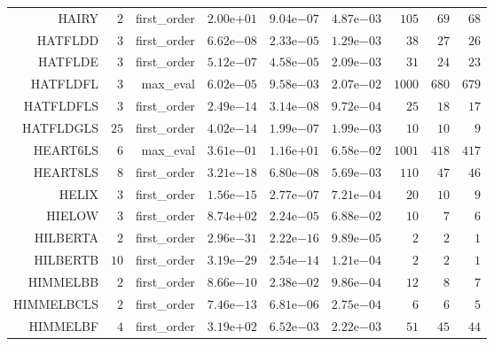 \begin{longtable}{rrrrrrrrr}
HAIRY & \(     2\) & first\_order & \( 2.00\)e\(+01\) & \( 9.04\)e\(-07\) & \( 4.87\)e\(-03\) & \(   105\) & \(    69\) & \(    68\) \\
HATFLDD & \(     3\) & first\_order & \( 6.62\)e\(-08\) & \( 2.33\)e\(-05\) & \( 1.29\)e\(-03\) & \(    38\) & \(    27\) & \(    26\) \\
HATFLDE & \(     3\) & first\_order & \( 5.12\)e\(-07\) & \( 4.58\)e\(-05\) & \( 2.09\)e\(-03\) & \(    31\) & \(    24\) & \(    23\) \\
HATFLDFL & \(     3\) & max\_eval & \( 6.02\)e\(-05\) & \( 9.58\)e\(-03\) & \( 2.07\)e\(-02\) & \(  1000\) & \(   680\) & \(   679\) \\
HATFLDFLS & \(     3\) & first\_order & \( 2.49\)e\(-14\) & \( 3.14\)e\(-08\) & \( 9.72\)e\(-04\) & \(    25\) & \(    18\) & \(    17\) \\
HATFLDGLS & \(    25\) & first\_order & \( 4.02\)e\(-14\) & \( 1.99\)e\(-07\) & \( 1.99\)e\(-03\) & \(    10\) & \(    10\) & \(     9\) \\
HEART6LS & \(     6\) & max\_eval & \( 3.61\)e\(-01\) & \( 1.16\)e\(+01\) & \( 6.58\)e\(-02\) & \(  1001\) & \(   418\) & \(   417\) \\
HEART8LS & \(     8\) & first\_order & \( 3.21\)e\(-18\) & \( 6.80\)e\(-08\) & \( 5.69\)e\(-03\) & \(   110\) & \(    47\) & \(    46\) \\
HELIX & \(     3\) & first\_order & \( 1.56\)e\(-15\) & \( 2.77\)e\(-07\) & \( 7.21\)e\(-04\) & \(    20\) & \(    10\) & \(     9\) \\
HIELOW & \(     3\) & first\_order & \( 8.74\)e\(+02\) & \( 2.24\)e\(-05\) & \( 6.88\)e\(-02\) & \(    10\) & \(     7\) & \(     6\) \\
HILBERTA & \(     2\) & first\_order & \( 2.96\)e\(-31\) & \( 2.22\)e\(-16\) & \( 9.89\)e\(-05\) & \(     2\) & \(     2\) & \(     1\) \\
HILBERTB & \(    10\) & first\_order & \( 3.19\)e\(-29\) & \( 2.54\)e\(-14\) & \( 1.21\)e\(-04\) & \(     2\) & \(     2\) & \(     1\) \\
HIMMELBB & \(     2\) & first\_order & \( 8.66\)e\(-10\) & \( 2.38\)e\(-02\) & \( 9.86\)e\(-04\) & \(    12\) & \(     8\) & \(     7\) \\
HIMMELBCLS & \(     2\) & first\_order & \( 7.46\)e\(-13\) & \( 6.81\)e\(-06\) & \( 2.75\)e\(-04\) & \(     6\) & \(     6\) & \(     5\) \\
HIMMELBF & \(     4\) & first\_order & \( 3.19\)e\(+02\) & \( 6.52\)e\(-03\) & \( 2.22\)e\(-03\) & \(    51\) & \(    45\) & \(    44\) \\

\end{longtable}
